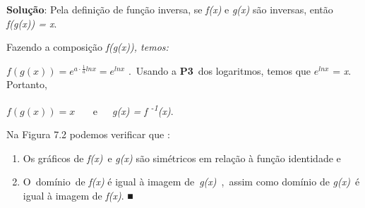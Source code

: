 \documentclass[12pt]{article}
\begin{document}
\begin{enumerate}[label*={\fontsize{14pt}{14pt}\selectfont \textbf{\arabic*.}}]
\begin{justify}
\textbf{Solução}: Pela definição de função inversa, se \textit{f(x)} e \textit{g(x)} são inversas, então \textit{f(g(x)) = x}. 
\end{justify}\par

\begin{adjustwidth}{0.59in}{0.0in}
\begin{justify}
Fazendo a composição \textit{f(g(x)), temos:}
\end{justify}\par

\end{adjustwidth}

\begin{adjustwidth}{0.59in}{0.0in}
\begin{justify}
 \( f \left( g \left( x \right)  \right) =e^{a⋅\frac{1}{a}lnx}=e^{lnx} \) .\  Usando a \textbf{P3}\ dos logaritmos, temos que   \( e^{lnx} \)  = \textit{x}. Portanto,
\end{justify}\par

\end{adjustwidth}

\begin{justify}
 \( f \left( g \left( x \right)  \right) =x \) \ \ \  e\ \ \  \textit{g(x) = f \textsuperscript{-1}(x)}. 
\end{justify}\par

\begin{adjustwidth}{0.59in}{0.0in}
\begin{justify}
Na Figura 7.2 podemos verificar que :
\end{justify}\par

\end{adjustwidth}

\begin{enumerate}
	\item Os gráficos de \textit{f(x)}\  e \textit{g(x)} são simétricos em relação à função identidade e\par

	\item  O\ domínio\ de   \textit{f(x)} é igual à imagem de\  \textit{g(x)}\ ,\ assim como domínio de   \textit{g(x)}\ é igual à imagem de  \textit{f(x)}. ■
\end{enumerate}\par




\end{enumerate}
\end{document}
